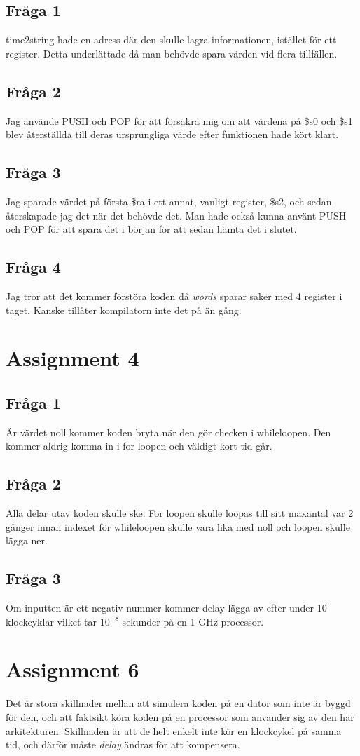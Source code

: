 \documentclass[a4paper,11p]{article}
\begin{document}
\subsection{Fråga 1}
time2string hade en adress där den skulle lagra informationen, istället för ett register. Detta underlättade då man behövde spara värden vid flera tillfällen. 
\subsection{Fråga 2}
Jag använde PUSH och POP för att försäkra mig om att värdena på \$s0 och \$s1 blev återställda till deras ursprungliga värde efter funktionen hade kört klart.
\subsection{Fråga 3}
Jag sparade värdet på första \$ra i ett annat, vanligt register, \$s2, och sedan återskapade jag det när det behövde det. Man hade också kunna använt PUSH och POP för att spara det i början för att sedan hämta det i slutet.
\subsection{Fråga 4}
Jag tror att det kommer förstöra koden då \emph{words} sparar saker med 4 register i taget. Kanske tillåter kompilatorn inte det på än gång. 
\section{Assignment 4}
\subsection{Fråga 1}
Är värdet noll kommer koden bryta när den gör checken i whileloopen. Den kommer aldrig komma in i for loopen och väldigt kort tid går.
\subsection{Fråga 2}
Alla delar utav koden skulle ske. For loopen skulle loopas till sitt maxantal var 2 gånger innan indexet för whileloopen skulle vara lika med noll och loopen skulle lägga ner.
\subsection{Fråga 3}
Om inputten är ett negativ nummer kommer delay lägga av efter under 10 klockcyklar vilket tar $10^{-8}$ sekunder på en 1 GHz processor.
\section{Assignment 6}
Det är stora skillnader mellan att simulera koden på en dator som inte är byggd för den, och att faktsikt köra koden på en processor som använder sig av den här arkitekturen. Skillnaden är att de helt enkelt inte kör en klockcykel på samma tid, och därför måste \emph{delay} ändras för att kompensera.
\end{document}
